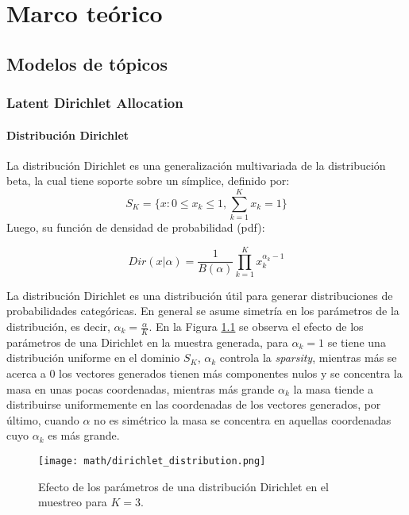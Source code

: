 \documentclass[letterpaper,12pt,oneside]{book} %
\begin{document}
\chapter{Marco teórico}
\section{Modelos de tópicos}
\subsection{Latent Dirichlet Allocation}
\subsubsection{Distribución Dirichlet}
La distribución Dirichlet es una generalización multivariada de la distribución beta, la cual tiene soporte sobre un símplice, definido por:
\begin{equation}
    S_{K} = \{x: 0\leq x_{k} \leq 1, \sum_{k=1}^{K}x_{k}=1\}
\end{equation}
Luego, su función de densidad de probabilidad (pdf):

\begin{equation}
    Dir(x|\alpha)=\frac{1}{B(\alpha)}\prod_{k=1}^{K}x_{k}^{\alpha_{k}-1}
\end{equation}

La distribución Dirichlet es una distribución útil para generar distribuciones de probabilidades categóricas. En general se asume simetría en los parámetros de la distribución, es decir, $\alpha_{k}=\frac{\alpha}{K}$. En la Figura \ref{img:dirichlet_distribution} se observa el efecto de los parámetros de una Dirichlet en la muestra generada, para $\alpha_{k}=1$ se tiene una distribución uniforme en el dominio $S_{K}$, $\alpha_{k}$ controla la \textit{sparsity}, mientras más se acerca a 0 los vectores generados tienen más componentes nulos y se concentra la masa en unas pocas coordenadas, mientras más grande $\alpha_{k}$ la masa tiende a distribuirse uniformemente en las coordenadas de los vectores generados, por último, cuando $\alpha$ no es simétrico la masa se concentra en aquellas coordenadas cuyo $\alpha_{k}$ es más grande.

\begin{figure}
    \centering
    \texttt{[image: math/dirichlet\_distribution.png]}
    \caption{Efecto de los parámetros de una distribución Dirichlet en el muestreo para $K=3$.}
    \label{img:dirichlet_distribution}
\end{figure}
\end{document}

